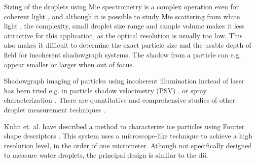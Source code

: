 Sizing of the droplets using Mie spectrometry is a complex operation even for coherent light \cite{bohr2008}, and although it is possible to study Mie scattering from white light \cite{ward2008}, the complexity, small droplet size range and sample volume makes it less attractive for this application, as the optical resolution is usually too low. This also makes it difficult to determine the exact particle size and the usable depth of field for incoherent shadowgraph systems. The shadow from a particle can e.g. appear smaller or larger when out of focus.

Shadowgraph imaging of particles using incoherent illumination instead of laser has been tried e.g. in particle shadow velocimetry (PSV) \cite{este2005}, or spray characterization \cite{will2010}. There are quantitative and comprehensive studies of other droplet measurement techniques \cite{dye1984,henn2013,conno2007}.

Kuhn et. al. \cite{kuhn2012} have described a method to characterize ice particles using Fourier shape descriptors \cite{gran1972,walla1980}. This system uses a microscope-like technique to achieve a high resolution level, in the order of one micrometer. Athough not specifically designed to measure water droplets, the principal design is similar to the \gls{dii}. 




